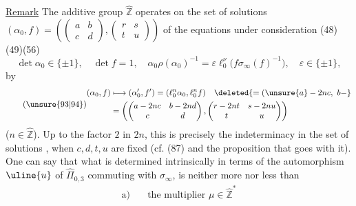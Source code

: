 

\uline{Remark} The additive group $\widehat{\mathbb Z}$ operates on the set
of solutions
$(\alpha_0,f)=\left(\begin{pmatrix}a&b\\c&d\end{pmatrix},
\begin{pmatrix}r&s\\t&u\end{pmatrix}\right)$
of the equations under consideration (48)(49)(56)
\[
\tag{93}
\det\alpha_0\in\{\pm1\},\quad\det f=1,\quad
\alpha_0\rho(\alpha_0)^{-1}
=\varepsilon\ell_0^{\nu}\bigl(f\sigma_\infty(f)^{-1}\bigr),
\quad\varepsilon\in\{\pm1\},
\]
by
\[
\tag{\unsure{93|94}}
\begin{aligned}
(\alpha_0,f)&\longmapsto(\alpha'_0,f')
=(\ell_0^n\alpha_0,\ell_0^nf)\quad\deleted{=(\unsure{a}-2nc,\ b-}\\
&=\left(\begin{pmatrix}a-2nc&b-2nd\\c&d\end{pmatrix},
\begin{pmatrix}r-2nt&s-2nu\\t&u\end{pmatrix}\right)
\end{aligned}
\]
($n\in\widehat{\mathbb Z}$).
Up to the factor $2$ in $2n$, this is precisely the indeterminacy in
 the set of solutions , when
$c,d,t,u$ are fixed (cf. (87) and the proposition that goes with it).
One can  say that what is determined
intrinsically 
in terms of the  automorphism $\uline{u}$ of
$\widehat{\Pi}_{0,3}$ commuting with $\sigma_\infty$, is neither more nor less
than 
\[
\tag{95}
\begin{aligned}
\text{a)}\quad&\text{the multiplier }\mu\in\widehat{\mathbb Z}^{*}
\end{aligned}
\]

